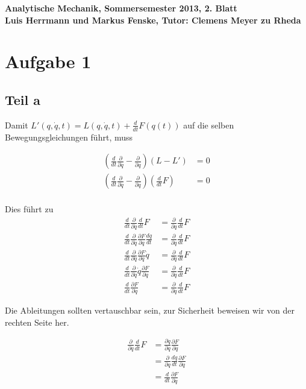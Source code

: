 \documentclass[a4paper,german,12pt,smallheadings]{scrartcl}
\begin{document}
\begin{center}
\bfseries %
\sffamily %
\vspace{-40pt}
Analytische Mechanik, Sommersemester 2013, 2. Blatt \\
Luis Herrmann und Markus Fenske, Tutor: Clemens Meyer zu Rheda
\vspace{-10pt}
\end{center}
\section*{Aufgabe 1}
\subsection*{Teil a}
Damit $L'(q, \dot{q}, t) = L(q, \dot{q}, t) + \frac{d}{dt} F(q(t))$ auf die
selben Bewegungsgleichungen führt, muss

\begin{align*}
  \left(\frac{d}{dt} \frac{\partial}{\partial \dot{q}} - \frac{\partial}{\partial q}\right) \left(L - L'\right) &= 0 \\
  \left(\frac{d}{dt} \frac{\partial}{\partial \dot{q}} - \frac{\partial}{\partial q}\right) \left(\frac{d}{dt} F\right) &= 0 \\
\end{align*}

Dies führt zu
\begin{align*}
  \frac{d}{dt} \frac{\partial}{\partial \dot{q}}\frac{d}{dt} F &= \frac{\partial}{\partial q}\frac{d}{dt} F \\
  \frac{d}{dt} \frac{\partial}{\partial \dot{q}}\frac{\partial F}{\partial q} \frac{dq}{dt} &= \frac{\partial}{\partial q}\frac{d}{dt} F\\
  \frac{d}{dt} \frac{\partial}{\partial \dot{q}}\frac{\partial F}{\partial q} \dot{q} &= \frac{\partial}{\partial q}\frac{d}{dt} F\\
  \frac{d}{dt} \frac{\partial}{\partial \dot{q}} \dot{q} \frac{\partial F}{\partial q} &= \frac{\partial}{\partial q}\frac{d}{dt} F\\
  \frac{d}{dt} \frac{\partial F}{\partial q} &= \frac{\partial}{\partial q}\frac{d}{dt} F
\end{align*}

Die Ableitungen sollten vertauschbar sein, zur Sicherheit beweisen wir von der
rechten Seite her.

\begin{align*}
  \frac{\partial}{\partial q}\frac{d}{dt} F &= \frac{\partial \dot{q}}{\partial q} \frac{\partial F}{\partial q} \\
                                            &= \frac{\partial}{\partial q} \frac{dq}{dt} \frac{\partial F}{\partial q} \\
                                            &= \frac{d}{dt} \frac{\partial F}{\partial q}
\end{align*}
\end{document}
